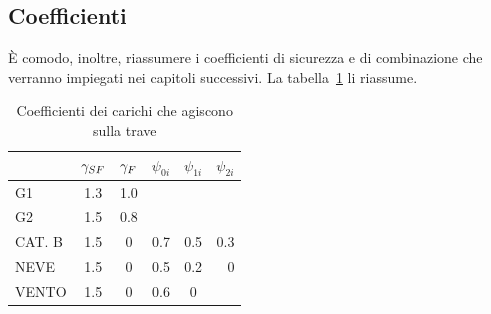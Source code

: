 \begin{table}
\caption{Riepilogo dei carichi agenti sulla trave}  
\label{tab:azioniTrave}
%
\end{table}

\subsection{Coefficienti}
È comodo, inoltre, riassumere i coefficienti di sicurezza e di combinazione che verranno impiegati nei capitoli successivi. La tabella~\ref{tab:coefTrave} li riassume.

\begin{table}
	\centering
	\caption{Coefficienti dei carichi che agiscono sulla trave}
	\label{tab:coefTrave}
	\begin{tabular}{lccccr}
		\toprule
		&$\gamma_{\MakeUppercase{sf}}$ & $\gamma_{\MakeUppercase{f}}$ &$\psi_{0i}$ &$\psi_{1i}$ &$\psi_{2i}$\\
		\midrule
		G1 & 1.3 &1.0\\
		G2 &1.5 &0.8\\
		CAT. B &1.5 &0 &0.7 &0.5 &0.3\\
		NEVE &1.5 &0 &0.5 &0.2 &0\\
		VENTO &1.5 &0 &0.6 & 0\\
		\bottomrule
	\end{tabular}
\end{table}


